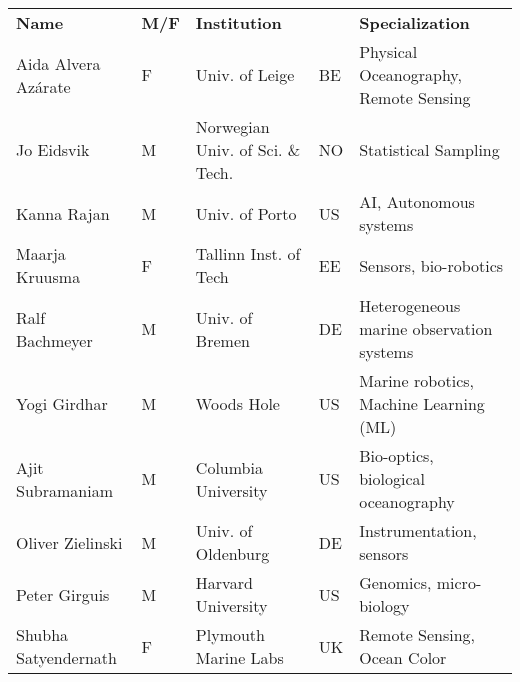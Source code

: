 \begin{table}[!t]
  \footnotesize{
\begin{tabular}{|p{3.5cm}|p{0.7cm}|p{4.0cm}|p{0.5cm}|p{6.0cm}|}
  \rowcolor{Gray}
  \bfseries Name& \bfseries M/F&\bfseries Institution & & \bfseries Specialization\\
  Aida Alvera Az\'{a}rate    & F   & Univ. of Leige                        & BE       &Physical Oceanography, Remote Sensing\\
  \hline
  Jo Eidsvik               & M   & Norwegian Univ. of Sci. \& Tech.        & NO       & Statistical Sampling                            \\
  \hline
  Kanna Rajan              & M   & Univ. of Porto            & US       & AI, Autonomous systems           \\
  \hline
  Maarja Kruusma  & F   & Tallinn Inst. of Tech
                                                      & EE  & Sensors,
                                                              bio-robotics                                \\
  \hline
  Ralf Bachmeyer           & M   & Univ. of Bremen                       & DE       & Heterogeneous marine observation systems                        \\
  \hline
  Yogi Girdhar             & M   & Woods Hole
                                                      & US       &
                                                                   Marine
                                                                   robotics,
                                                                   Machine
                                                                   Learning
  (ML)\\
  \hline
  Ajit Subramaniam         & M   & Columbia University
                                                      & US       &
                                                                   Bio-optics, biological oceanography                        \\
  \hline
  Oliver Zielinski          & M   & Univ. of Oldenburg                   & DE       & Instrumentation, sensors                        \\
  \hline
  Peter Girguis            & M   & Harvard University                               & US       & Genomics, micro-biology                         \\
  \hline
  Shubha Satyendernath     & F   & Plymouth Marine Labs                  & UK       & Remote Sensing, Ocean Color                     \\

\end{tabular}}
\end{table}
